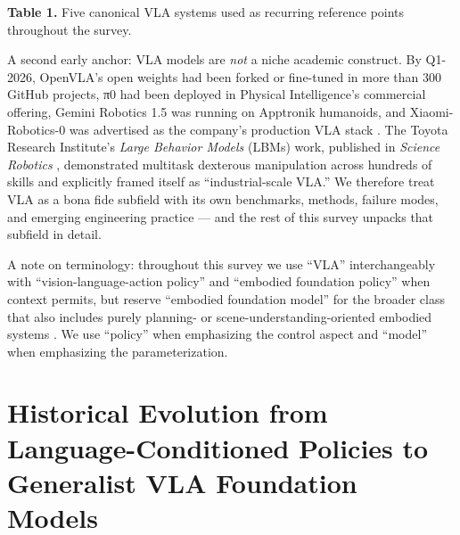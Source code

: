 \documentclass{article}
\begin{document}
\textbf{Table 1.} Five canonical VLA systems used as recurring reference points throughout the survey.

A second early anchor: VLA models are \emph{not} a niche academic construct. By Q1-2026, OpenVLA's open weights had been forked or fine-tuned in more than 300 GitHub projects, π0 had been deployed in Physical Intelligence's commercial offering, Gemini Robotics 1.5 was running on Apptronik humanoids, and Xiaomi-Robotics-0 was advertised as the company's production VLA stack \cite{cai2026xiaomirobotics0ano}. The Toyota Research Institute's \emph{Large Behavior Models} (LBMs) work, published in \emph{Science Robotics} \cite{barreiros2026acarefulexaminatio}, demonstrated multitask dexterous manipulation across hundreds of skills and explicitly framed itself as ``industrial-scale VLA.'' We therefore treat VLA as a bona fide subfield with its own benchmarks, methods, failure modes, and emerging engineering practice --- and the rest of this survey unpacks that subfield in detail.

A note on terminology: throughout this survey we use ``VLA'' interchangeably with ``vision-language-action policy'' and ``embodied foundation policy'' when context permits, but reserve ``embodied foundation model'' for the broader class that also includes purely planning- or scene-understanding-oriented embodied systems \cite{liu2024aligningcyberspace}. We use ``policy'' when emphasizing the control aspect and ``model'' when emphasizing the parameterization.

\section{Historical Evolution from Language-Conditioned Policies to Generalist VLA Foundation Models}\label{historical-evolution-from-language-conditioned-policies-to-generalist-vla-foundation-models}
\end{document}
